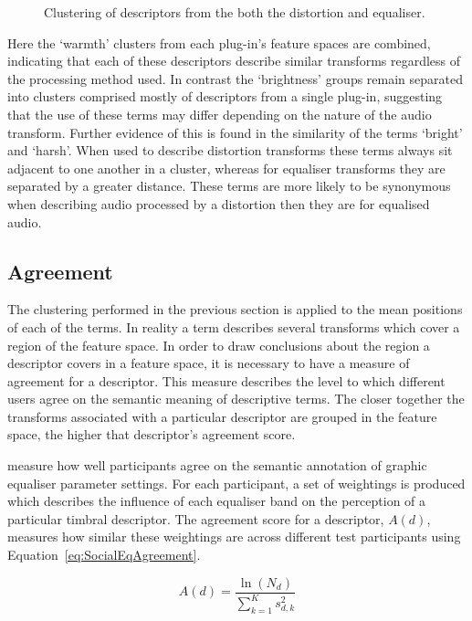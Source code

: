 \begin{figure}[h!]
{					\label{fig:CombinedDifferenceClusters}
				}
				\caption{Clustering of descriptors from the both the distortion and equaliser.}
				\label{fig:CombinedClusters}
			\end{figure}

			Here the `warmth' clusters from each plug-in's feature spaces are combined, indicating that each of
			these descriptors describe similar transforms regardless of the processing method used. In contrast
			the `brightness' groups remain separated into clusters comprised mostly of descriptors from a
			single plug-in, suggesting that the use of these terms may differ depending on the nature of the
			audio transform.  Further evidence of this is found in the similarity of the terms `bright' and
			`harsh'.  When used to describe distortion transforms these terms always sit adjacent to one
			another in a cluster, whereas for equaliser transforms they are separated by a greater distance.
			These terms are more likely to be synonymous when describing audio processed by a distortion then
			they are for equalised audio. 

	\subsection{Agreement}
	\label{sec:TimbreEvaluation-Analysis-Agreement}
		The clustering performed in the previous section is applied to the mean positions of each of the terms. In
		reality a term describes several transforms which cover a region of the feature space. In order to draw
		conclusions about the region a descriptor covers in a feature space, it is necessary to have a measure of
		agreement for a descriptor. This measure describes the level to which different users agree on the semantic
		meaning of descriptive terms. The closer together the transforms associated with a particular descriptor
		are grouped in the feature space, the higher that descriptor's agreement score.

		\citet{cartwright2013socialeq} measure how well participants agree on the semantic annotation of graphic
		equaliser parameter settings. For each participant, a set of weightings is produced which describes the
		influence of each equaliser band on the perception of a particular timbral descriptor. The agreement score
		for a descriptor, $A(d)$, measures how similar these weightings are across different test participants
		using Equation~\ref{eq:SocialEqAgreement}.

		\begin{equation}
			A(d) = \frac{\ln(N_{d})}{\sum_{k = 1}^{K} s_{d,k}^{2}}
			\label{eq:SocialEqAgreement}
		\end{equation}

